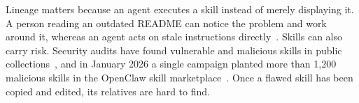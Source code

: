 Lineage matters because an agent executes a skill instead of merely displaying it. A person
reading an outdated README can notice the problem and work around it, whereas an agent acts
on stale instructions directly~\cite{gao2026registry}. Skills can also carry risk. Security
audits have found vulnerable and malicious skills in public collections~\cite{liu2026wild},
and in January 2026 a single campaign planted more than 1,200 malicious skills in the
OpenClaw skill marketplace~\cite{zhu2026skillreuse}. Once a flawed skill has been copied and
edited, its relatives are hard to find.
